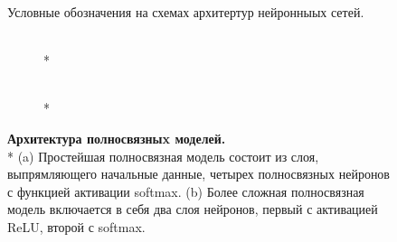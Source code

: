\begin{figure}[h] %
	\centering
	
	\caption{Условные обозначения на схемах архитертур нейронныых сетей.}
	\label{fig:legend}	
\end{figure}

\begin{figure*}[h] %
	\centering
	\begin{subfigure}[t]{0.55\linewidth}
		
		\caption{{\bfseries} \\*}		
		\label{fig:dnn_1_scheme}
	\end{subfigure}
	\begin{subfigure}[t]{0.40\linewidth}
				
		\caption{{\bfseries} \\*}
		\label{fig:dnn_2_scheme}
	\end{subfigure}
	\caption{{\bfseries Архитектура полносвязныx моделей.} \\*
	(a) Простейшая полносвязная модель состоит из слоя, выпрямляющего начальные данные, четырех полносвязных нейронов с функцией активации softmax. (b) Более сложная полносвязная модель включается в себя два слоя нейронов, первый с активацией ReLU, второй с softmax.}
	
	\label{fig:dnn_scheme}
	
\end{figure*}


